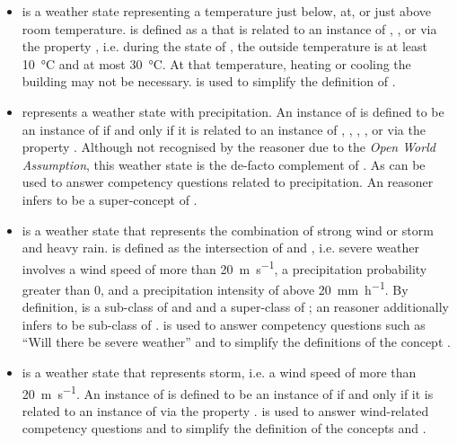 \begin{itemize}
  \item {} is a weather state representing a temperature just below, at, or just above room temperature.  is defined as a  that is related to an instance of , , or  via the property , i.e. during the state of , the outside temperature is at least \SI{10}{\celsius} and at most \SI{30}{\celsius}. At that temperature, heating or cooling the building may not be necessary.  is used to simplify the definition of .
  
  \item {} represents a weather state with precipitation. An instance of  is defined to be an instance of  if and only if it is related to an instance of , , , , or  via the property . Although not recognised by the  reasoner due to the \emph{Open World Assumption}, this weather state is the de-facto complement of . As  can be used to answer competency questions related to precipitation. An  reasoner infers  to be a super-concept of .

  \item {} is a weather state that represents the combination of strong wind or storm and heavy rain.  is defined as the intersection of  and , i.e. severe weather involves a wind speed of more than \SI{20}{\metre\per\second}, a precipitation probability greater than \num{0}, and a precipitation intensity of above \SI{20}{\milli\metre\per\hour}. By definition,  is a sub-class of  and  and a super-class of ; an  reasoner additionally infers  to be sub-class of .  is used to answer competency questions such as ``Will there be severe weather'' and to simplify the definitions of the concept .
  
  \item {} is a weather state that represents storm, i.e. a wind speed of more than \SI{20}{\metre\per\second}. An instance of  is defined to be an instance of  if and only if it is related to an instance of  via the property .  is used to answer wind-related competency questions and to simplify the definition of the concepts  and .
  

\end{itemize}
